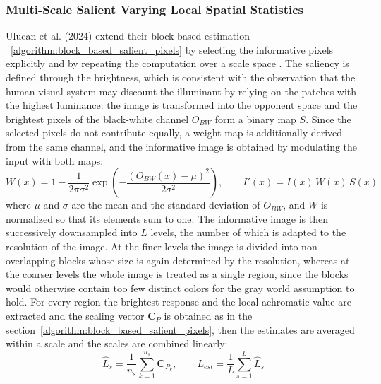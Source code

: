 \subsubsection{Multi-Scale Salient Varying Local Spatial Statistics}
\label{algorithm:multi_scale_salient}
Ulucan et al. (2024) extend their block-based estimation ~\ref{algorithm:block_based_salient_pixels} by selecting the informative pixels explicitly and by repeating the computation over a scale space \cite{ulucanMultiScaleSalient}. The saliency is defined through the brightness, which is consistent with the observation that the human visual system may discount the illuminant by relying on the patches with the highest luminance: the image is transformed into the opponent space and the brightest pixels of the black-white channel $O_{BW}$ form a binary map $S$. Since the selected pixels do not contribute equally, a weight map is additionally derived from the same channel, and the informative image is obtained by modulating the input with both maps:
\begin{equation}
W(x) = 1 - \frac{1}{2\pi\sigma^2}\exp\left(-\frac{\left(O_{BW}(x) - \mu\right)^2}{2\sigma^2}\right), \qquad
I'(x) = I(x) \, W(x) \, S(x)
\end{equation}
where $\mu$ and $\sigma$ are the mean and the standard deviation of $O_{BW}$, and $W$ is normalized so that its elements sum to one. The informative image is then successively downsampled into $L$ levels, the number of which is adapted to the resolution of the image. At the finer levels the image is divided into non-overlapping blocks whose size is again determined by the resolution, whereas at the coarser levels the whole image is treated as a single region, since the blocks would otherwise contain too few distinct colors for the gray world assumption to hold. For every region the brightest response and the local achromatic value are extracted and the scaling vector $\mathbf{C}_P$ is obtained as in the section~\ref{algorithm:block_based_salient_pixels}, then the estimates are averaged within a scale and the scales are combined linearly:
\begin{equation}
\hat{L}_s = \frac{1}{n_s}\sum_{k=1}^{n_s} \mathbf{C}_{P_k}, \qquad
L_{est} = \frac{1}{L}\sum_{s=1}^{L} \hat{L}_s
\end{equation}
